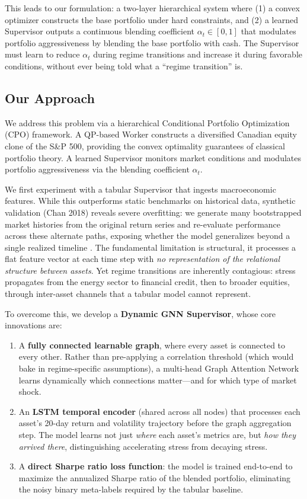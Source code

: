 \documentclass[conferences]{IEEEtran}
\begin{document}
This leads to our formulation: a two-layer hierarchical system where (1) a convex optimizer constructs the base portfolio under hard constraints, and (2) a learned Supervisor outputs a continuous blending coefficient $\alpha_t \in [0,1]$ that modulates portfolio aggressiveness by blending the base portfolio with cash. The Supervisor must learn to reduce $\alpha_t$ during regime transitions and increase it during favorable conditions, without ever being told what a ``regime transition'' is.

\subsection{Our Approach}

We address this problem via a hierarchical Conditional Portfolio Optimization (CPO) framework. A QP-based Worker constructs a diversified Canadian equity clone of the S\&P 500, providing the convex optimality guarantees of classical portfolio theory. A learned Supervisor monitors market conditions and modulates portfolio aggressiveness via the blending coefficient $\alpha_t$.

We first experiment with a tabular Supervisor that ingests macroeconomic features. While this outperforms static benchmarks on historical data, synthetic validation (Chan 2018) reveals severe overfitting: we generate many bootstrapped market histories from the original return series and re-evaluate performance across these alternate paths, exposing whether the model generalizes beyond a single realized timeline \cite{chan2018}. The fundamental limitation is structural, it processes a flat feature vector at each time step with \emph{no representation of the relational structure between assets}. Yet regime transitions are inherently contagious: stress propagates from the energy sector to financial credit, then to broader equities, through inter-asset channels that a tabular model cannot represent.

To overcome this, we develop a \textbf{Dynamic GNN Supervisor}, whose core innovations are:
\begin{enumerate}
    \item A \textbf{fully connected learnable graph}, where every asset is connected to every other. Rather than pre-applying a correlation threshold (which would bake in regime-specific assumptions), a multi-head Graph Attention Network learns dynamically which connections matter---and for which type of market shock.
    \item An \textbf{LSTM temporal encoder} (shared across all nodes) that processes each asset's 20-day return and volatility trajectory before the graph aggregation step. The model learns not just \emph{where} each asset's metrics are, but \emph{how they arrived there}, distinguishing accelerating stress from decaying stress.
    \item A \textbf{direct Sharpe ratio loss function}: the model is trained end-to-end to maximize the annualized Sharpe ratio of the blended portfolio, eliminating the noisy binary meta-labels required by the tabular baseline.
\end{enumerate}
\end{document}

